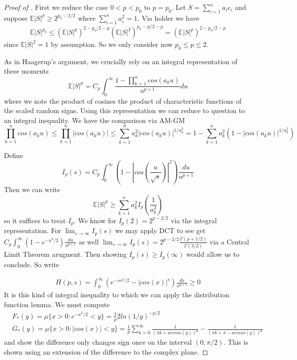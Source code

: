\documentclass[10pt]{article}
\newcommand{\E}{\mathbb{E}}
\newcommand{\1}{\textbf{1}}
\theoremstyle{remark}
\theoremstyle{definition}
\begin{document}
\begin{proof}[Proof of \cite{NP}]
	First we reduce the case $0 < p < p_0$ to $p = p_0$. Let $S = \sum_{i=1}^n a_i \epsilon_i$ and suppose $\E|S|^p \geq 2^{p_0 - 2/2}$ where $\sum_{i=1}^n a_i^2 = 1$. Via holder we have
	\begin{equation*}
		\E|S|^{p_0} \leq (\E|S|^p)^{2-p_0/2-p}(\E|S|^2)^{p_0-p/2-p} = (\E|S|^p)^{2-p_0/2-p}
	\end{equation*} 
	since $\E|S|^2 = 1$ by assumption. So we only consider now $p_0 \leq p \leq 2$. 

	As in Haagerup's argument, we crucially rely on an integral representation of these moments
	\begin{equation*}
		\E|S|^p = C_p\int_0^{\infty}\frac{1-\prod_{k=1}^n cos(a_k u)}{u^{p+1}}du
	\end{equation*} where we note the product of cosines the product of characteristic functions of the scaled random signs. Using this representation we can reduce to question to an integral inequality. We have the comparison via AM-GM
	\begin{equation*}
		\prod_{k=1}^n cos(a_k u) \leq \prod_{k=1}^n |cos(a_k u)| \leq \sum_{k=1}^n a_k^2|cos(a_k u)|^{1/a_k^2} = 1 - \sum_{k=1}^na_k^2(1- |cos(a_k u)|^{1/a_k^2})
	\end{equation*}

	Define 
	\begin{equation*}
		I_p(s) = C_p\int_0^{\infty}(1-|cos(\frac{u}{\sqrt{s}})|^2)\frac{du}{u^{p+1}}
	\end{equation*} Then we can write
	\begin{equation*}
		\E|S|^p \geq \sum_{k=1}^na_k^2 I_p(\frac{1}{a_k^2})
	\end{equation*} so it suffices to treat $I_p$. We know for $I_p(2) = 2^{p-2/2}$ via the integral representation. For $\lim_{s \to \infty}I_p(s)$ we may apply DCT to see get $C_p \int_0^{\infty}(1-e^{-u^2/2})\frac{du}{u^{p+1}}$ as well $\lim_{s \to \infty}I_p(s) = 2^{p-2/2}\frac{\Gamma(p+1/2)}{\Gamma(3/2)}$ via a Central Limit Theorem arugment. Then showing $I_p(s) \geq I_p(\infty)$ would allow us to conclude. So write

	\begin{align*}
		H(p,s) = \int_0^{\infty}(e^{-sx^2/2} - |cos(x)|^s)\frac{dx}{x^{p+1}} \geq 0 
	\end{align*} It is this kind of integral inequality to which we can apply the distribution function lemma. We must compute
	\begin{align*}
		&F_*(y) = \mu\{x > 0 : e^{-x^2/2} < y\} = \frac{1}{p}2ln(1/y)^{-p/2}\\
		&G_*(y) = \mu\{x > 0: |cos(x)| < y\} = \frac{1}{p}\sum_{k=0}^{\infty}\frac{1}{(\pi k + arccos(y))^p} - \frac{1}{(\pi k + \pi - arccos(y))^p}
	\end{align*} and show the difference only changes sign once on the interval $(0,\pi/2)$. This is shown using an extension of the difference to the complex plane.


\end{proof}
\end{document}
